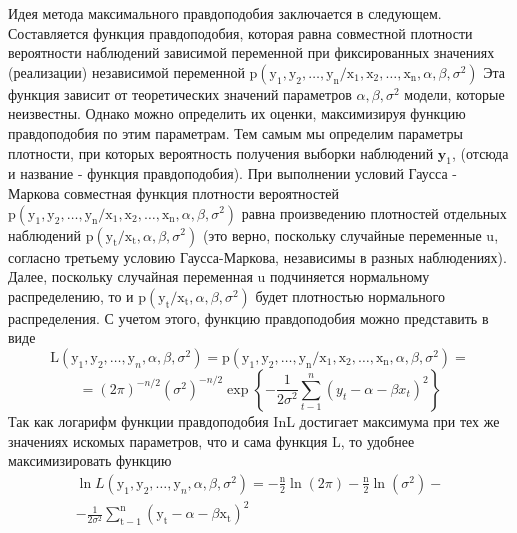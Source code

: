 \documentclass[a4paper, 12pt]{article}
\begin{document}
Идея метода максимального правдоподобия заключается в следующем. Составляется функция правдоподобия, которая равна совместной плотности вероятности наблюдений зависимой переменной при фиксированных значениях (реализации) независимой переменной $\mathrm{p}\left(\mathrm{y}_{1}, \mathrm{y}_{2}, \ldots, \mathrm{y}_{\mathrm{n}} / \mathrm{x}_{1}, \mathrm{x}_{2}, \ldots, \mathrm{x}_{\mathrm{n}}, \alpha, \beta, \sigma^{2}\right)$
Эта функция зависит от теоретических значений параметров $\alpha, \beta, \sigma^{2}$ модели, которые неизвестны. Однако можно определить их оценки, максимизируя функцию правдоподобия по этим параметрам. Тем самым мы определим параметры плотности, при которых вероятность получения выборки наблюдений $\mathbf{y}_{1}$,
(отсюда и название - функция правдоподобия). При выполнении условий Гаусса - Маркова совместная функция плотности вероятностей $\mathrm{p}\left(\mathrm{y}_{1}, \mathrm{y}_{2}, \ldots, \mathrm{y}_{\mathrm{n}} / \mathrm{x}_{1}, \mathrm{x}_{2}, \ldots, \mathrm{x}_{\mathrm{n}}, \alpha, \beta, \sigma^{2}\right)$ равна произведению плотностей отдельных наблюдений $\mathrm{p}\left(\mathrm{y}_{\mathrm{t}} / \mathrm{x}_{\mathrm{t}}, \alpha, \beta, \sigma^{2}\right)$ (это верно, поскольку случайные переменные
u, согласно третьему условию Гаусса-Маркова, независимы в разных наблюдениях). Далее, поскольку случайная переменная u подчиняется нормальному распределению, то и $\mathrm{p}\left(\mathrm{y}_{\mathrm{t}} / \mathrm{x}_{\mathrm{t}}, \alpha, \beta, \sigma^{2}\right)$ будет плотностью нормального распределения. С учетом этого, функцию правдоподобия можно представить в виде
$$
\mathrm{L}\left(\mathrm{y}_{1}, \mathrm{y}_{2}, \ldots, \mathrm{y}_{n}, \alpha, \beta, \sigma^{2}\right)=\mathrm{p}\left(\mathrm{y}_{1}, \mathrm{y}_{2}, \ldots, \mathrm{y}_{\mathrm{n}} / \mathrm{x}_{1}, \mathrm{x}_{2}, \ldots, \mathrm{x}_{\mathrm{n}}, \alpha, \beta, \sigma^{2}\right)=
$$
$$
=(2 \pi)^{-n / 2}\left(\sigma^{2}\right)^{-n / 2} \exp \left\{-\frac{1}{2 \sigma^{2}} \sum_{t-1}^{n}\left(y_{t}-\alpha-\beta x_{t}\right)^{2}\right\}
$$
Так как логарифм функции правдоподобия InL достигает максимума при тех же значениях искомых параметров, что и сама функция L, то удобнее максимизировать функцию
$$
\begin{array}{c}
	\ln L\left(\mathrm{y}_{1}, \mathrm{y}_{2}, \ldots, \mathrm{y}_{n}, \alpha, \beta, \sigma^{2}\right)=-\frac{\mathrm{n}}{2} \ln (2 \pi)-\frac{\mathrm{n}}{2} \ln \left(\sigma^{2}\right)- \\
	-\frac{1}{2 \sigma^{2}} \sum_{\mathrm{t}-1}^{\mathrm{n}}\left(\mathrm{y}_{\mathrm{t}}-\alpha-\beta \mathrm{x}_{\mathrm{t}}\right)^{2}
\end{array}
$$
\end{document}
